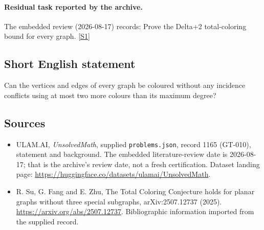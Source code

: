 \documentclass[11pt,a4paper]{article}
\newcommand{\sref}[2]{\hyperlink{source:#1:#2}{[S#2]}}
\begin{document}
\paragraph{Residual task reported by the archive.}

The embedded review (2026-08-17) records: Prove the Delta+2 total-coloring bound for every graph. \sref{1165}{1}

\subsection{Short English statement}

Can the vertices and edges of every graph be coloured without any incidence conflicts using at most two more colours than its maximum degree?

\subsection{Sources}

{\small

\begin{itemize}

\item[\hypertarget{source:1165:1}{S1}] ULAM.AI, \emph{UnsolvedMath}, supplied \texttt{problems.json}, record 1165 (GT-010), statement and background. The embedded literature-review date is 2026-08-17; that is the archive’s review date, not a fresh certification. Dataset landing page: \url{https://huggingface.co/datasets/ulamai/UnsolvedMath}.

\item[\hypertarget{source:1165:2}{S2}] R. Su, G. Fang and E. Zhu, The Total Coloring Conjecture holds for planar graphs without three special subgraphs, arXiv:2507.12737 (2025). \url{https://arxiv.org/abs/2507.12737}. Bibliographic information imported from the supplied record.

\end{itemize}

}

\label{end:1165}
\end{document}
